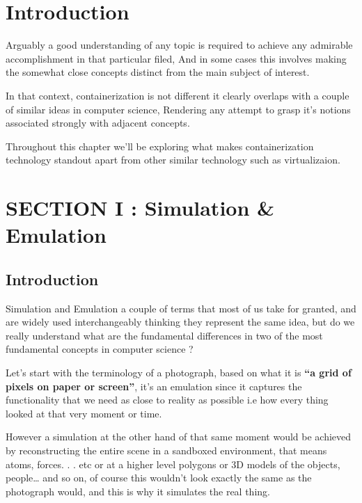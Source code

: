 \documentclass[
  14pt,
  english,
  a4paper,
]{scrreprt}
\begin{document}
\hypertarget{introduction-1}{%
\section{Introduction}\label{introduction-1}}

Arguably a good understanding of any topic is required to achieve any
admirable accomplishment in that particular filed, And in some cases
this involves making the somewhat close concepts distinct from the main
subject of interest.

In that context, containerization is not different it clearly overlaps
with a couple of similar ideas in computer science, Rendering any
attempt to grasp it's notions associated strongly with adjacent
concepts.

Throughout this chapter we'll be exploring what makes containerization
technology standout apart from other similar technology such as
virtualizaion.

\hypertarget{section-i-simulation-emulation}{%
\section{SECTION I : Simulation \&
Emulation}\label{section-i-simulation-emulation}}

\hypertarget{introduction-2}{%
\subsection{Introduction}\label{introduction-2}}

Simulation and Emulation a couple of terms that most of us take for
granted, and are widely used interchangeably thinking they represent the
same idea, but do we really understand what are the fundamental
differences in two of the most fundamental concepts in computer science
?

Let's start with the terminology of a photograph, based on what it is
\textbf{``a grid of pixels on paper or screen''}, it's an emulation
since it captures the functionality that we need as close to reality as
possible i.e how every thing looked at that very moment or time.

However a simulation at the other hand of that same moment would be
achieved by reconstructing the entire scene in a sandboxed environment,
that means atoms, forces. . . etc or at a higher level polygons or 3D
models of the objects, people\ldots{} and so on, of course this wouldn't
look exactly the same as the photograph would, and this is why it
simulates the real thing.
\end{document}
